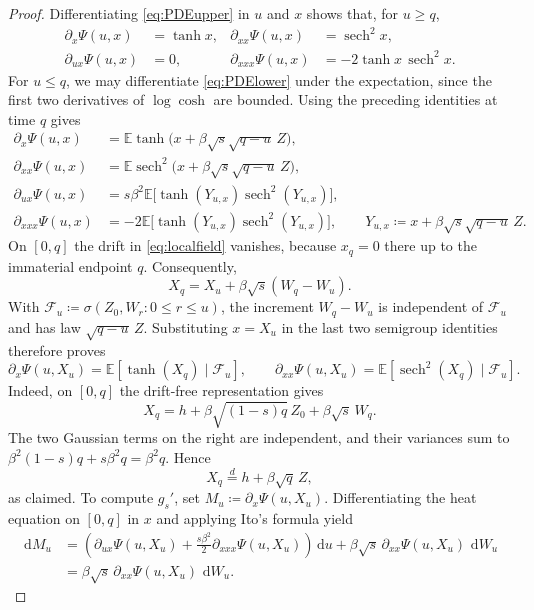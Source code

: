 \documentclass[11pt]{article}
\numberwithin{equation}{section}
\newcommand{\E}{\mathbb{E}}
\newcommand{\1}{\mathbf 1}
\newcommand{\sech}{\operatorname{sech}}
\newcommand{\dd}{\,\mathrm d}
\begin{document}
\begin{proof}
Differentiating \eqref{eq:PDEupper} in $u$ and $x$ shows that, for
$u\ge q$,
\begin{align*}
 \partial_x\Psi(u,x)&=\tanh x,
 &\partial_{xx}\Psi(u,x)&=\sech^2x,\\
 \partial_{ux}\Psi(u,x)&=0,
 &\partial_{xxx}\Psi(u,x)&=-2\tanh x\,\sech^2x.
\end{align*}
For $u\le q$, we may differentiate \eqref{eq:PDElower} under the
expectation, since the first two derivatives of $\log\cosh$ are bounded.
Using the preceding identities at time $q$ gives
\begin{align*}
 \partial_x\Psi(u,x)
 &=\E\tanh\bigl(x+\beta\sqrt{s}\sqrt{q-u}\,Z\bigr),\\
 \partial_{xx}\Psi(u,x)
 &=\E\sech^2\bigl(x+\beta\sqrt{s}\sqrt{q-u}\,Z\bigr),\\
 \partial_{ux}\Psi(u,x)
 &=s\beta^2\E\bigl[\tanh(Y_{u,x})\sech^2(Y_{u,x})\bigr],\\
 \partial_{xxx}\Psi(u,x)
 &=-2\E\bigl[\tanh(Y_{u,x})\sech^2(Y_{u,x})\bigr],
 \qquad
 Y_{u,x}\coloneqq x+\beta\sqrt{s}\sqrt{q-u}\,Z.
 \end{align*}
On $[0,q]$ the drift in \eqref{eq:localfield} vanishes, because
$x_q=0$ there up to the immaterial endpoint $q$.  Consequently,
\[
 X_q=X_u+\beta\sqrt{s}(W_q-W_u).
\]
With $\mathcal F_u\coloneqq\sigma(Z_0,W_r:0\le r\le u)$, the increment
$W_q-W_u$ is independent of $\mathcal F_u$ and has law
$\sqrt{q-u}\,Z$.  Substituting $x=X_u$ in the last two semigroup
identities therefore proves
\[
 \partial_x\Psi(u,X_u)=\E[\tanh(X_q)\mid\mathcal F_u],
 \qquad
 \partial_{xx}\Psi(u,X_u)=\E[\sech^2(X_q)\mid\mathcal F_u].
\]
Indeed, on $[0,q]$ the drift-free representation gives
\[
 X_q=h+\beta\sqrt{(1-s)q}\,Z_0+\beta\sqrt{s}\,W_q.
\]
The two Gaussian terms on the right are independent, and their variances
sum to $\beta^2(1-s)q+s\beta^2q=\beta^2q$.  Hence
\begin{equation}
 X_q\stackrel d=h+\beta\sqrt q\,Z,
 \label{eq:Xq}
\end{equation}
as claimed.  To compute $g_s'$, set
$M_u\coloneqq\partial_x\Psi(u,X_u)$.  Differentiating the heat equation on
$[0,q]$ in $x$ and applying Ito's formula yield
\begin{align*}
 \dd M_u
 &=\left(\partial_{ux}\Psi(u,X_u)
   +\frac{s\beta^2}{2}\partial_{xxx}\Psi(u,X_u)\right)\dd u
   +\beta\sqrt{s}\,\partial_{xx}\Psi(u,X_u)\,\dd W_u\\
 &=\beta\sqrt{s}\,\partial_{xx}\Psi(u,X_u)\,\dd W_u.
\end{align*}

\end{proof}
\end{document}
